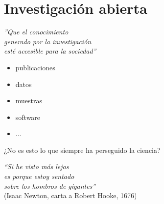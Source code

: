 \documentclass[17pt,aspectratio=169]{beamer}
\begin{document}
\section{Investigación abierta}

\begin{frame}

  \begin{center}
    {\Large \em''Que el conocimiento\\
      generado por la investigación\\
      esté accesible para la sociedad''\\}
  \end{center}

  \begin{itemize}
  \item publicaciones
  \item datos
  \item muestras
  \item software
  \item ...
  \end{itemize}

\end{frame}

\begin{frame}

  \begin{center}
    {\Large ¿No es esto lo que siempre ha perseguido la ciencia?\\}
  \end{center}

  \vspace{1cm}
  
  \begin{flushright}
    {\em ``Si he visto más lejos\\
    es porque estoy sentado\\
    sobre los hombros de gigantes''\\}
  \vspace{.3cm}
    {\small (Isaac Newton, carta a Robert Hooke, 1676)\\}
  \end{flushright}
\end{frame}

\end{document}
